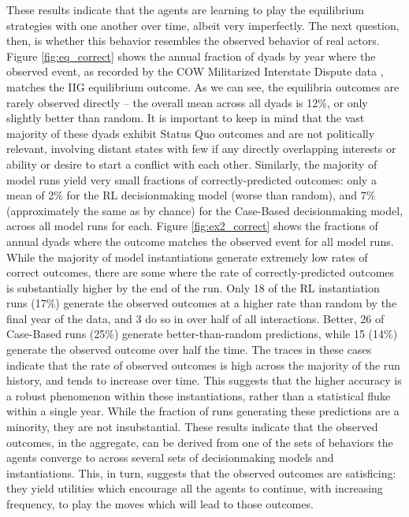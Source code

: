These results indicate that the agents are learning to play the equilibrium strategies with one another over time, albeit very imperfectly. The next question, then, is whether this behavior resembles the observed behavior of real actors. Figure \ref{fig:eq_correct} shows the annual fraction of dyads by year where the observed event, as recorded by the COW Militarized Interstate Dispute data \citep{palmer_2015}, matches the IIG equilibrium outcome. As we can see, the equilibria outcomes are rarely observed directly -- the overall mean across all dyads is 12\%, or only slightly better than random. It is important to keep in mind that the vast majority of these dyads exhibit Status Quo outcomes and are not politically relevant, involving distant states with few if any directly overlapping interests or ability or desire to start a conflict with each other. Similarly, the majority of model runs yield very small fractions of correctly-predicted outcomes: only a mean of 2\% for the RL decisionmaking model (worse than random), and 7\% (approximately the same as by chance) for the Case-Based decisionmaking model, across all model runs for each. Figure \ref{fig:ex2_correct} shows the fractions of annual dyads where the outcome matches the observed event for all model runs. While the majority of model instantiations generate extremely low rates of correct outcomes, there are some where the rate of correctly-predicted outcomes is substantially higher by the end of the run. Only 18 of the RL instantiation runs (17\%) generate the observed outcomes at a higher rate than random by the final year of the data, and 3 do so in over half of all interactions. Better, 26 of Case-Based runs (25\%) generate better-than-random predictions, while 15 (14\%) generate the observed outcome over half the time. The traces in these cases indicate that the rate of observed outcomes is high across the majority of the run history, and tends to increase over time. This suggests that the higher accuracy is a robust phenomenon within these instantiations, rather than a statistical fluke within a single year. While the fraction of runs generating these predictions are a minority, they are not insubstantial. These results indicate that the observed outcomes, in the aggregate, can be derived from one of the sets of behaviors the agents converge to across several sets of decisionmaking models and instantiations. This, in turn, suggests that the observed outcomes are satisficing: they yield utilities which encourage all the agents to continue, with increasing frequency, to play the moves which will lead to those outcomes.

